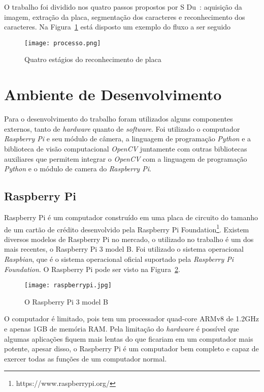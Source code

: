 O trabalho foi dividido nos quatro passos propostos por S
Du~\cite{s2013automatic}: aquisição da imagem, extração da placa, segmentação
dos caracteres e reconhecimento dos caracteres. Na Figura~\ref{fig:processo}
está disposto um exemplo do fluxo a ser seguido

\begin{figure}[H]
	\centering
	\texttt{[image: processo.png]}
	\caption{Quatro estágios do reconhecimento de placa}
	\label{fig:processo}
\end{figure}

\section{Ambiente de Desenvolvimento}

Para o desenvolvimento do trabalho foram utilizados alguns componentes externos, tanto de \emph{hardware} quanto de \emph{software}. Foi utilizado o computador \emph{Raspberry Pi} e seu módulo de câmera, a linguagem de programação \emph{Python} e a biblioteca de visão computacional \emph{OpenCV} juntamente com outras bibliotecas auxiliares que permitem integrar o \emph{OpenCV} com a linguagem de programação \emph{Python} e o módulo de camera do \emph{Raspberry Pi}.

\subsection{Raspberry Pi}
\label{sec:raspi}

Raspberry Pi é um computador construído em uma placa de circuito do tamanho de um cartão de crédito desenvolvido pela Raspberry Pi Foundation\footnote{https://www.raspberrypi.org/}. Existem diversos modelos de Raspberry Pi no mercado, o utilizado no trabalho é um dos mais recentes, o Raspberry Pi 3 model B. Foi utilizado o sistema
operacional \emph{Raspbian}, que é o sistema operacional oficial suportado pela
\emph{Raspberry Pi Foundation}. O Raspberry Pi pode ser visto na Figura~\ref{fig:raspberrypi}.

\begin{figure}[H]
	\centering
	\texttt{[image: raspberrypi.jpg]}
	\caption{O Raspberry Pi 3 model B}
	\label{fig:raspberrypi}
\end{figure}

O computador é limitado, pois tem um processador
quad-core ARMv8 de 1.2GHz e apenas 1GB de memória RAM\@. Pela limitação do
\emph{hardware} é possível que algumas aplicações fiquem mais lentas do que
ficariam em um computador mais potente, apesar disso, o Raspberry Pi é um
computador bem completo e capaz de exercer todas as funções de um computador
normal.

